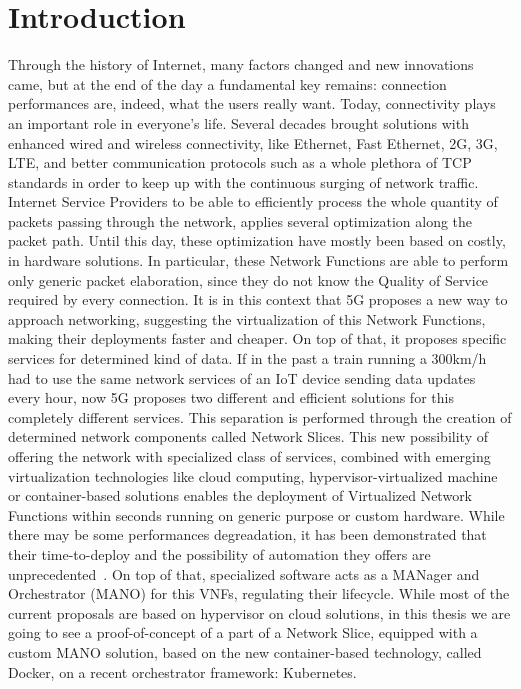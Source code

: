 \chapter{Introduction}
\label{chap:intro}

Through the history of Internet, many factors changed and new innovations came,
but at the end of the day a fundamental key remains: connection performances
are, indeed, what the users really want. Today, connectivity plays an important
role in everyone's life. Several decades brought solutions with enhanced wired
and wireless connectivity, like Ethernet, Fast Ethernet, 2G, 3G, LTE, and better
communication protocols such as a whole plethora of TCP standards in order to
keep up with the continuous surging of network traffic. Internet Service
Providers to be able to efficiently process the whole quantity of packets
passing through the network, applies several optimization along the packet path.
Until this day, these optimization have mostly been based on costly, in hardware
solutions. In particular, these Network Functions are able to perform only
generic packet elaboration, since they do not know the Quality of Service
required by every connection. It is in this context that 5G proposes a new way
to approach networking, suggesting the virtualization of this Network Functions,
making their deployments faster and cheaper. On top of that, it proposes
specific services for determined kind of data. If in the past a train running a
300km/h had to use the same network services of an IoT device sending data
updates every hour, now 5G proposes two different and efficient solutions for
this completely different services. This separation is performed through the
creation of determined network components called Network Slices. This new
possibility of offering the network with specialized class of services, combined
with emerging virtualization technologies like cloud computing,
hypervisor-virtualized machine or container-based solutions enables the
deployment of Virtualized Network Functions within seconds running on generic
purpose or custom hardware. While there may be some performances degreadation,
it has been demonstrated that their time-to-deploy and the possibility of
automation they offers are unprecedented~\cite{nguyen2017sdn}. On top of that,
specialized software acts as a MANager and Orchestrator (MANO) for this VNFs,
regulating their lifecycle. While most of the current proposals are based on
hypervisor on cloud solutions, in this thesis we are going to see a
proof-of-concept of a part of a Network Slice, equipped with a custom MANO
solution, based on the new container-based technology, called Docker, on a
recent orchestrator framework: Kubernetes.
 
